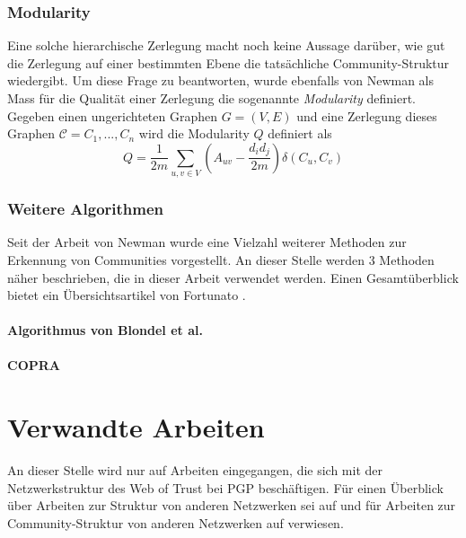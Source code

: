 \cite{Girvan2002}

\subsubsection{Modularity}
\label{sec:modularity}

Eine solche hierarchische Zerlegung macht noch keine Aussage
dar\"uber, wie gut die Zerlegung auf einer bestimmten Ebene die
tats\"achliche Community-Struktur wiedergibt. Um diese Frage zu
beantworten, wurde ebenfalls von Newman als Mass f\"ur die Qualit\"at
einer Zerlegung die sogenannte \emph{Modularity} definiert. Gegeben
einen ungerichteten Graphen $G=(V, E)$ und eine Zerlegung dieses
Graphen $\mathcal{C} = C_1, ..., C_n$ wird die Modularity $Q$
definiert als
\begin{equation}
  \label{eq:modularity}
  Q =
  \frac{1}{2m}\sum_{u, v \in V}\left(A_{uv}-\frac{d_id_j}{2m}\right)\delta(C_u, C_v)
\end{equation}

\subsubsection{Weitere Algorithmen}
\label{sec:algorithmen}

Seit der Arbeit von Newman wurde eine Vielzahl weiterer Methoden zur
Erkennung von Communities vorgestellt. An dieser Stelle werden 3
Methoden n\"aher beschrieben, die in dieser Arbeit verwendet
werden. Einen Gesamt\"uberblick bietet ein \"Ubersichtsartikel von
Fortunato \cite{Fortunato2010}.

\paragraph{Algorithmus von Blondel et al.}
\label{sec:algor-von-blond}

\paragraph{COPRA}
\label{sec:copra}

\section{Verwandte Arbeiten}
\label{ch:Grundlagen:sec:RelatedWork}

An dieser Stelle wird nur auf Arbeiten eingegangen, die sich mit der
Netzwerkstruktur des Web of Trust bei PGP besch\"aftigen. F\"ur einen
\"Uberblick \"uber Arbeiten zur Struktur von anderen Netzwerken sei
auf \cite{newman:167}und f\"ur Arbeiten zur Community-Struktur von
anderen Netzwerken auf \cite{Fortunato2010} verwiesen.

